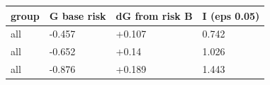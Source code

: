 \begingroup\small
\setlength{\tabcolsep}{3pt}
\renewcommand{\arraystretch}{1.04}
\begin{tabularx}{\linewidth}{XXXX}
\toprule
group & G base risk & dG from risk B & I (eps 0.05) \\
\midrule
all & -0.457 & +0.107 & 0.742 \\
all & -0.652 & +0.14 & 1.026 \\
all & -0.876 & +0.189 & 1.443 \\
\bottomrule
\end{tabularx}
\endgroup
